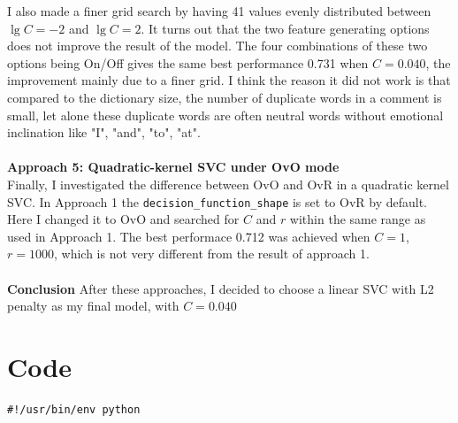 \documentclass{article}
\begin{document}
I also made a finer grid search by having 41 values evenly distributed between
$\lg C=-2$ and $\lg C=2$.
It turns out that the two feature generating options does not improve the result of the model. The four combinations of these two options being On/Off
gives the same best performance 0.731 when $C=0.040$,
the improvement mainly due to a finer grid. I think the reason it did not work
is that compared to the dictionary size,
the number of duplicate words in a comment is small,
let alone these duplicate words are often neutral words without emotional inclination
like "I", "and", "to", "at". \\\\
\textbf{Approach 5: Quadratic-kernel SVC under OvO mode}\\
\indent Finally, I investigated the difference between OvO and OvR in a quadratic kernel SVC.
In Approach 1 the \texttt{decision\_function\_shape} is set to OvR by default.
Here I changed it to OvO and searched for $C$ and $r$ within the same range as used in Approach 1.
The best performace 0.712 was achieved when $C=1$, $r=1000$,
which is not very different from the result of approach 1.\\\\
\textbf{Conclusion} After these approaches, I decided to choose a linear SVC with L2 penalty as my final model, with $C=0.040$

\newpage
\section*{Code}
\begin{lstlisting}
#!/usr/bin/env python


\end{lstlisting}
\end{document}
